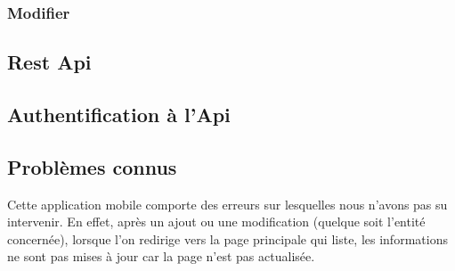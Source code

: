
			\subsubsection{Modifier}


		\subsection{Rest Api}


		\subsection{Authentification à l'Api}


		\subsection{Problèmes connus}

			Cette application mobile comporte des erreurs sur lesquelles nous n'avons pas su intervenir. En effet, après un ajout ou une modification (quelque soit l'entité concernée), lorsque l'on redirige vers la page principale qui liste, les informations ne sont pas mises à jour car la page n'est pas actualisée.


